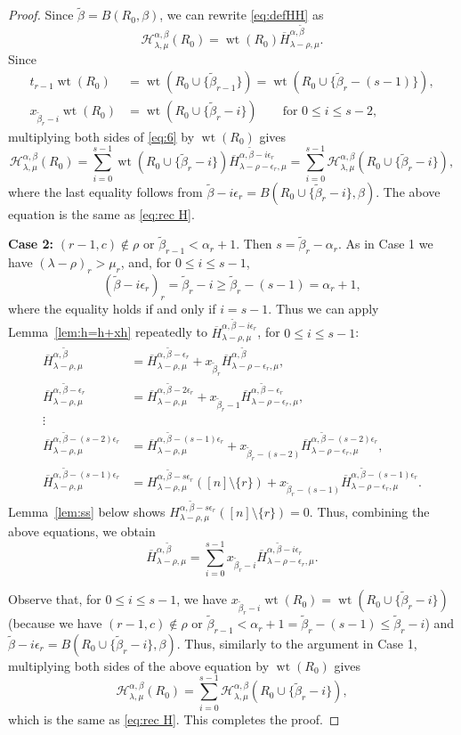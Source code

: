 \documentclass[12pt]{amsart}
\numberwithin{equation}{section}
\theoremstyle{definition}
\newcommand\wb{\widetilde{\beta}}
\newcommand\ovH{\overline{H}}
\newcommand\wt{\operatorname{wt}}
\newcommand\HH{\mathcal{H}}
\begin{document}
\begin{proof}
Since $\wb=B(R_0,\beta)$,
we can rewrite \eqref{eq:defHH} as
\[
  \HH_{\lambda,\mu}^{\alpha,\beta}(R_0)
  = \wt(R_0) \ovH_{\lambda-\rho,\mu}^{\alpha,\wb}.
\]
Since 
\begin{align*}
t_{r-1}\wt(R_0) &= \wt(R_0\cup\{\wb_{r-1}\}) = \wt(R_0\cup\{\wb_{r}-(s-1)\}),\\
  x_{\wb_r-i} \wt(R_0)&=\wt(R_0\cup\{\wb_r-i\})
                        \qquad \mbox{for $0 \le i \le s-2$,}
\end{align*}
multiplying both sides of
\eqref{eq:6} by $\wt(R_0)$ gives
\[
  \HH^{\alpha,\beta}_{\lambda,\mu}(R_0)
    = \sum_{i=0}^{s-1} \wt(R_0\cup\{\wb_r-i\}) \ovH_{\lambda-\rho-\epsilon_r,\mu}^{\alpha,\wb-i\epsilon_r}
    = \sum_{i=0}^{s-1} \HH^{\alpha,\beta}_{\lambda,\mu}(R_0\cup\{\wb_r-i\}),
\]  
where the last equality follows from $\wb-i\epsilon_r =
B(R_0\cup\{\wb_r-i\},\beta)$. The above equation is the same as \eqref{eq:rec
  H}.

\textbf{Case 2:} $(r-1,c)\not\in\rho$ or $\wb_{r-1}<\alpha_r+1$. Then
$s=\wb_r-\alpha_r$. As in Case 1 we have $(\lambda-\rho)_r>\mu_r$, and, for
$0\le i\le s-1$,
  \[
(\wb-i\epsilon_r)_r =\wb_r-i \ge \wb_r -(s-1) =  \alpha_r +1,
\]
where the equality holds if and only if $i=s-1$. Thus we can apply
Lemma~\ref{lem:h=h+xh} repeatedly to
$\ovH^{\alpha,\wb-i\epsilon_r}_{\lambda-\rho,\mu}$, for $0\le i\le s-1$:
\begin{align*}
  \ovH^{\alpha,\wb}_{\lambda-\rho,\mu} &=
  \ovH^{\alpha,\wb-\epsilon_r}_{\lambda-\rho,\mu}
  + x_{\wb_r}\ovH^{\alpha,\wb}_{\lambda-\rho-\epsilon_r,\mu},\\
  \ovH^{\alpha,\wb-\epsilon_r}_{\lambda-\rho,\mu} &=
  \ovH^{\alpha,\wb-2\epsilon_r}_{\lambda-\rho,\mu}
  + x_{\wb_r-1}\ovH^{\alpha,\wb-\epsilon_r}_{\lambda-\rho-\epsilon_r,\mu},\\
  \vdots \\
  \ovH^{\alpha,\wb-(s-2)\epsilon_r}_{\lambda-\rho,\mu} &=
  \ovH^{\alpha,\wb-(s-1)\epsilon_r}_{\lambda-\rho,\mu}
  + x_{\wb_r-(s-2)}\ovH^{\alpha,\wb-(s-2)\epsilon_r}_{\lambda-\rho-\epsilon_r,\mu},\\
  \ovH^{\alpha,\wb-(s-1)\epsilon_r}_{\lambda-\rho,\mu} &=
  H^{\alpha,\wb-s\epsilon_r}_{\lambda-\rho,\mu}([n]\setminus\{r\})
  + x_{\wb_r-(s-1)}\ovH^{\alpha,\wb-(s-1)\epsilon_r}_{\lambda-\rho-\epsilon_r,\mu}.
\end{align*}
Lemma~\ref{lem:ss} below shows
$H^{\alpha,\wb-s\epsilon_r}_{\lambda-\rho,\mu}([n]\setminus\{r\})= 0$. Thus,
combining the above equations, we obtain
\[
  \ovH^{\alpha,\wb}_{\lambda-\rho,\mu} =
  \sum_{i=0}^{s-1} x_{\wb_r-i}
  \ovH^{\alpha,\wb-i\epsilon_r}_{\lambda-\rho-\epsilon_r,\mu}.
\]

Observe that, for $0\le i\le s-1$, we have $x_{\wb_r-i}
\wt(R_0)=\wt(R_0\cup\{\wb_r-i\})$ (because we have $(r-1,c) \notin \rho$ or
$\wb_{r-1} < \alpha_r + 1 = \wb_r - (s-1) \le \wb_r - i$) and $\wb-i\epsilon_r =
B(R_0\cup\{\wb_r-i\},\beta)$. Thus, similarly to the argument in Case 1,
multiplying both sides of the above equation by $\wt(R_0)$ gives
\[
  \HH^{\alpha,\beta}_{\lambda,\mu}(R_0)
    = \sum_{i=0}^{s-1} \HH^{\alpha,\beta}_{\lambda,\mu}(R_0\cup\{\wb_r-i\}),
\]  
which is the same as \eqref{eq:rec H}.
This completes the proof.
\end{proof}
\end{document}
